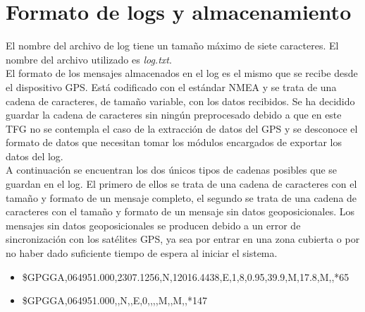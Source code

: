 \chapter{Formato de logs y almacenamiento}
\label{anexo:log}
El nombre del archivo de log tiene un tamaño máximo de siete caracteres. El nombre del archivo utilizado es \textit{log.txt}.\\


El formato de los mensajes almacenados en el log es el mismo que se recibe desde el dispositivo GPS. Está codificado con el estándar NMEA y se trata de una cadena de caracteres, de tamaño variable, con los datos recibidos. Se ha decidido guardar la cadena de caracteres sin ningún preprocesado debido a que en este TFG no se contempla el caso de la extracción de datos del GPS y se desconoce el formato de datos que necesitan tomar los módulos encargados de exportar los datos del log.\\


A continuación se encuentran los dos únicos tipos de cadenas posibles que se guardan en el log. El primero de ellos se trata de una cadena de caracteres con el tamaño y formato de un mensaje completo, el segundo se trata de una cadena de caracteres con el tamaño y formato de un mensaje sin datos geoposicionales. Los mensajes sin datos geoposicionales se producen debido a un error de sincronización con los satélites GPS, ya sea por entrar en una zona cubierta o por no haber dado suficiente tiempo de espera al iniciar el sistema.\\


\begin{itemize}
\item \$GPGGA,064951.000,2307.1256,N,12016.4438,E,1,8,0.95,39.9,M,17.8,M,,*65
\item \$GPGGA,064951.000,,N,,E,0,,,,M,,M,,*147
\end{itemize}
